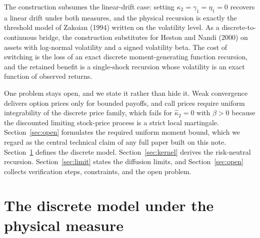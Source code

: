 \documentclass[11pt]{article}
\theoremstyle{remark}
\begin{document}
The construction subsumes the linear-drift case: setting
$\kappa_2=\gamma_1=\eta_1=0$ recovers a linear drift under both measures,
and the physical recursion is exactly the threshold model of Zakoian (1994)
written on the volatility level.
As a discrete-to-continuous bridge, the construction substitutes for Heston
and Nandi (2000) on assets with log-normal volatility and a signed
volatility beta.
The cost of switching is the loss of an exact discrete moment-generating
function recursion, and the retained benefit is a single-shock recursion
whose volatility is an exact function of observed returns.

One problem stays open, and we state it rather than hide it.
Weak convergence delivers option prices only for bounded payoffs, and call
prices require uniform integrability of the discrete price family, which
fails for $\hat\kappa_2=0$ with $\beta>0$ because the discounted limiting
stock-price process is a strict local martingale.
Section~\ref{sec:open} formulates the required uniform moment bound, which
we regard as the central technical claim of any full paper built on this
note.
Section~\ref{sec:model} defines the discrete model.
Section~\ref{sec:kernel} derives the risk-neutral recursion.
Section~\ref{sec:limit} states the diffusion limits, and
Section~\ref{sec:open} collects verification steps, constraints, and the
open problem.

\section{The discrete model under the physical measure}\label{sec:model}
\end{document}
